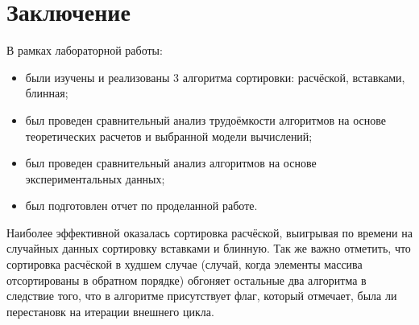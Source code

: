 \chapter*{Заключение}

В рамках лабораторной работы:
\begin{itemize}
	\item были изучены и реализованы 3 алгоритма сортировки: расчёской, вставками, блинная;
	\item был проведен сравнительный анализ трудоёмкости алгоритмов на основе теоретических расчетов и выбранной модели вычислений;
	\item был проведен сравнительный анализ алгоритмов на основе экспериментальных данных;
    \item был подготовлен отчет по проделанной работе.
\end{itemize}

Наиболее эффективной оказалась сортировка расчёской, выигрывая по времени на случайных данных сортировку вставками и блинную.
Так же важно отметить, что сортировка расчёской в худшем случае (случай, когда элементы массива отсортированы в обратном порядке) обгоняет остальные два алгоритма в следствие того, что в алгоритме присутствует флаг, который отмечает, была ли перестановк на итерации внешнего цикла.
